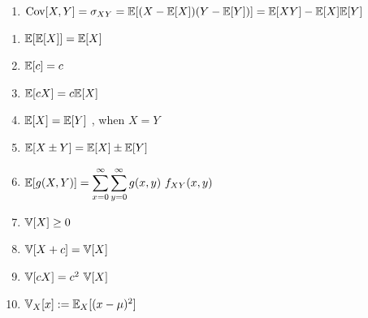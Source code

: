\begin{enumerate}[series=calcrulesrv]
    \item 
    $
        \text{Cov}[X, Y]
        = \sigma_{X Y}
        = \mathbb{E}[(X - \mathbb{E}[X])(Y - \mathbb{E}[Y])]
        = \mathbb{E}[X Y] - \mathbb{E}[X]\mathbb{E}[Y]
    $
    \hfill \cite{statistics/book/Statistics-for-Data-Scientists/Maurits-Kaptein}
\end{enumerate}



\begin{multicols}{2}
\begin{enumerate}[resume*=calcrulesrv]
    \item $\mathbb{E}[\mathbb{E}[X]] = \mathbb{E}[X]$
    \hfill \cite{common/online/chatgpt}

    \item $\mathbb{E}[c] = c$
    \hfill \cite{statistics/book/Statistics-for-Data-Scientists/Maurits-Kaptein}

    \item $\mathbb{E}[cX] = c \mathbb{E}[X]$
    \hfill \cite{statistics/book/Statistics-for-Data-Scientists/Maurits-Kaptein}

    \item $\mathbb{E}[X] = \mathbb{E}[Y]$ , when $X = Y$
    \hfill \cite{statistics/book/Statistics-for-Data-Scientists/Maurits-Kaptein}

    \item $\mathbb{E}[X \pm Y] = \mathbb{E}[X] \pm \mathbb{E}[Y]$
    \hfill \cite{statistics/book/Statistics-for-Data-Scientists/Maurits-Kaptein, mfml/book/mml/Deisenroth-Faisal-Ong}

    \item $\mathbb{E}[g(X, Y )] = \displaystyle\sum^\infty_{x=0} \displaystyle\sum^\infty_{y=0} g(x, y)\ f_{X Y} (x, y)$
    \hfill \cite{statistics/book/Statistics-for-Data-Scientists/Maurits-Kaptein}


    
    
    \item $\mathbb{V}[X] \geq 0$
    \hfill \cite{statistics/book/Statistics-for-Data-Scientists/Maurits-Kaptein}

    \item $\mathbb{V}[X + c] = \mathbb{V}[X]$
    \hfill \cite{statistics/book/Statistics-for-Data-Scientists/Maurits-Kaptein}

    \item $\mathbb{V}[cX] = c^2\ \mathbb{V}[X]$
    \hfill \cite{statistics/book/Statistics-for-Data-Scientists/Maurits-Kaptein}

    \item $\mathbb{V}_X [x] := \mathbb{E}_X [(x - \mu)^2]$    
    \hfill \cite{mfml/book/mml/Deisenroth-Faisal-Ong}


\end{enumerate}
\end{multicols}
